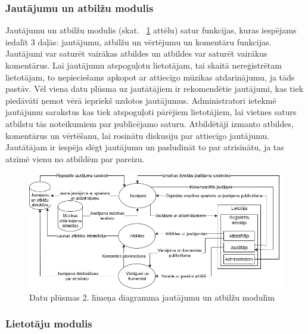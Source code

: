 \documentclass[12pt]{article}
\begin{document}
\subsubsection{Jautājumu un atbilžu modulis}

Jautājumu un atbilžu modulis (skat. ~\ref{fig:dpd_2_2} attēlu) satur funkcijas, kuras iespējams iedalīt 3 daļās: jautājumu, atbilžu un vērtējumu un komentāru funkcijas. Jautājumi var saturēt vairākas atbildes un atbildes var saturēt vairākus komentārus. Lai jautājumu atspoguļotu lietotājam, tai skaitā nereģistrētam lietotājam, to nepieciešams apkopot ar attiecīgo mūzikas atdarinājumu, ja tāds pastāv. Vēl viena datu plūsma uz jautātājiem ir rekomendētie jautājumi, kas tiek piedāvāti ņemot vērā iepriekš uzdotos jautājumus. Administratori ietekmē jautājumu sarakstus kas tiek atspoguļoti pārējiem lietotājiem, lai vietnes saturs atbilstu tās noteikumiem par publicējamo saturu. Atbildētāji izmanto atbildes, komentārus un vērtēšanu, lai rosinātu diskusiju par attiecīgo jautājumu. Jautātājam ir iespēja slēgt jautājumu un pasludināt to par atrisinātu, ja tas atzīmē vienu no atbildēm par pareizu.

\begin{figure}[H]
\begin{center}
	\includegraphics[scale=0.5]{DPD2_2.png}
	\caption{Datu plūsmas 2. līmeņa diagramma jautājumu un atbilžu modulim}
	\label{fig:dpd_2_2}
\end{center}
\end{figure}

\subsubsection{Lietotāju modulis}
\end{document}
